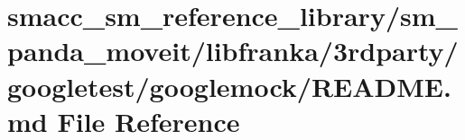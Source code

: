 \hypertarget{smacc__sm__reference__library_2sm__panda__moveit_2libfranka_23rdparty_2googletest_2googlemock_2README_8md}{}\section{smacc\+\_\+sm\+\_\+reference\+\_\+library/sm\+\_\+panda\+\_\+moveit/libfranka/3rdparty/googletest/googlemock/\+R\+E\+A\+D\+ME.md File Reference}
\label{smacc__sm__reference__library_2sm__panda__moveit_2libfranka_23rdparty_2googletest_2googlemock_2README_8md}
